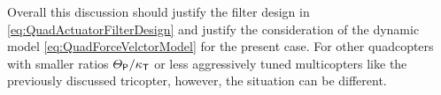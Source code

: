 Overall this discussion should justify the filter design in \eqref{eq:QuadActuatorFilterDesign} and justify the consideration of the dynamic model \eqref{eq:QuadForceVelctorModel} for the present case.
For other quadcopters with smaller ratios $\varTheta_\mathsf{P} / \kappa_{\mathsf{T}}$ or less aggressively tuned multicopters like the previously discussed tricopter, however, the situation can be different.


% 
% 
